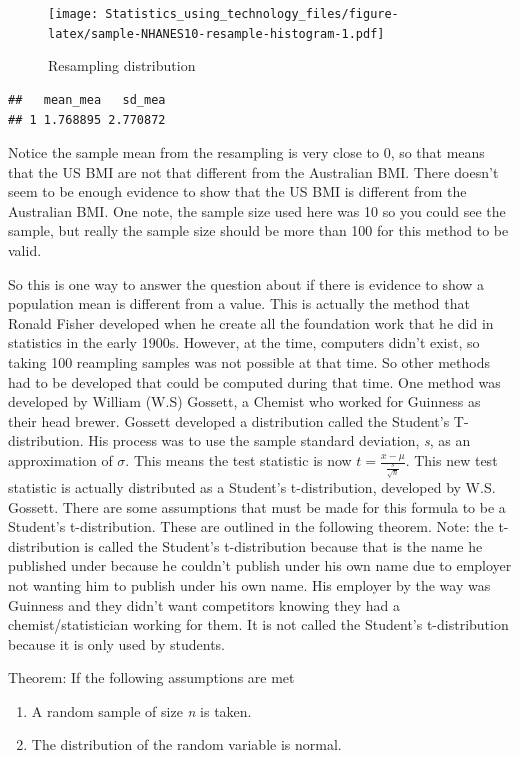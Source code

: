 \documentclass[
]{book}
\begin{document}
\begin{figure}
\centering
\texttt{[image: Statistics\_using\_technology\_files/figure-latex/sample-NHANES10-resample-histogram-1.pdf]}
\caption{\label{fig:sample-NHANES10-resample-histogram}Resampling distribution}
\end{figure}

\begin{verbatim}
##   mean_mea   sd_mea
## 1 1.768895 2.770872
\end{verbatim}

Notice the sample mean from the resampling is very close to 0, so that means that the US BMI are not that different from the Australian BMI. There doesn't seem to be enough evidence to show that the US BMI is different from the Australian BMI. One note, the sample size used here was 10 so you could see the sample, but really the sample size should be more than 100 for this method to be valid.

So this is one way to answer the question about if there is evidence to show a population mean is different from a value. This is actually the method that Ronald Fisher developed when he create all the foundation work that he did in statistics in the early 1900s. However, at the time, computers didn't exist, so taking 100 reampling samples was not possible at that time. So other methods had to be developed that could be computed during that time. One method was developed by William (W.S) Gossett, a Chemist who worked for Guinness as their head brewer. Gossett developed a distribution called the Student's T-distribution. His process was to use the sample standard deviation, \emph{s}, as an approximation of \(\sigma\). This means the test statistic is now \(t=\frac{x-\mu}{\frac{s}{\sqrt{n}}}\). This new test statistic is actually distributed as a Student's t-distribution, developed by W.S. Gossett. There are some assumptions that must be made for this formula to be a Student's t-distribution. These are outlined in the following theorem. Note: the t-distribution is called the Student's t-distribution because that is the name he published under because he couldn't publish under his own name due to employer not wanting him to publish under his own name. His employer by the way was Guinness and they didn't want competitors knowing they had a chemist/statistician working for them. It is not called the Student's t-distribution because it is only used by students.

Theorem: If the following assumptions are met

\begin{enumerate}
\def\labelenumi{\alph{enumi}.}
\item
  A random sample of size \emph{n} is taken.
\item
  The distribution of the random variable is normal.
\end{enumerate}
\end{document}
